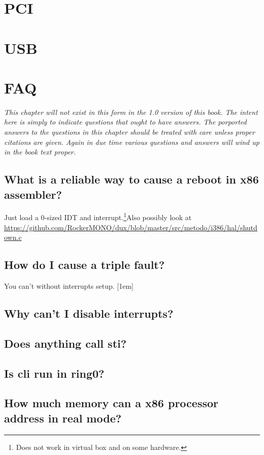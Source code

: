 \documentclass[oneside,english,final]{amsbook}
\newcommand\cn{{\small{\ap{\textbf{[\textit{citation-needed}]}}}}}
\begin{document}
\chapter{PCI}
\chapter{USB}

\chapter{FAQ} {\small\textit{This chapter will not exist in this form in
    the 1.0 version of this book. The intent here is simply to indicate
    questions that ought to have answers. The porported
    answers to the questions in this chapter should be treated with care
    unless proper citations are given. Again in due time various questions
    and answers will wind up in the book text proper.}}
\section{What is a reliable way to cause a reboot in x86 assembler?}

Just load a 0-sized IDT and interrupt.\footnote{Does not work in virtual
  box and on some hardware.}\cn Also possibly look at
\url{https://github.com/RockerMONO/dux/blob/master/src/metodo/i386/hal/shutdown.c}


\section{How do I cause a triple fault?}

You can't without interrupts setup.  [1em]

\section{Why can't I disable interrupts?}

\section{Does anything call sti?}

\section{Is cli run in ring0?}

\section{How much memory can a x86 processor address in real mode?}
\end{document}
